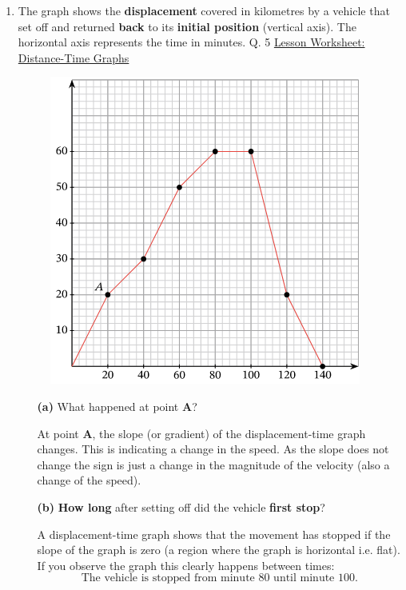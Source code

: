 \documentclass[A4,12pt]{article}
\begin{document}
\begin{enumerate}[label=\bfseries (\arabic*)]
\item The graph shows the \textbf{displacement} covered in kilometres by a vehicle that set off and returned \textbf{back} to its \textbf{initial position} (vertical axis). The horizontal axis represents the time in minutes. \cite{Nagwa} Q. 5 \href{https://www.nagwa.com/en/worksheets/932192593730/}{Lesson Worksheet: Distance-Time Graphs}
%
\begin{figure}[H]
    \centering
    \includegraphics[scale=1]{Nagwa_Q5_kin2.png}
\end{figure}
%
\begin{itemize}
    \item[\bf (a)] What happened at point \textbf{A}?
    \begin{example}
    At point \textbf{A}, the slope (or gradient) of the displacement-time graph changes. This is indicating a change in the speed. As the slope does not change the sign is just a change in the magnitude of the velocity (also a change of the speed).
    \end{example}
    \item[\bf (b)] \textbf{How long} after setting off did the vehicle \textbf{first stop}?
    \begin{example}
    A displacement-time graph shows that the movement has stopped if the slope of the graph is zero (a region where the graph is horizontal i.e. flat). If you observe the graph this clearly happens between times:\\
    \begin{equation*}
        \text{The vehicle is stopped from minute 80 until minute 100.}

\end{equation*}
\end{example}
\end{itemize}
\end{enumerate}
\end{document}
